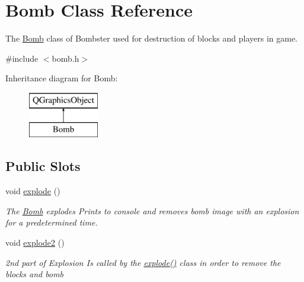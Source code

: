 \hypertarget{class_bomb}{\section{Bomb Class Reference}
\label{class_bomb}
}


The \hyperlink{class_bomb}{Bomb} class of Bombster used for destruction of blocks and players in game.  




{\ttfamily \#include $<$bomb.\-h$>$}

Inheritance diagram for Bomb\-:\begin{figure}[H]
\begin{center}
\leavevmode
\includegraphics[height=2.000000cm]{class_bomb}
\end{center}
\end{figure}
\subsection*{Public Slots}
\begin{DoxyCompactItemize}
\item 
void \hyperlink{class_bomb_a5752ce7daece5c3bf2e2178bcfcb820d}{explode} ()
\begin{DoxyCompactList}\small\item\em The \hyperlink{class_bomb}{Bomb} explodes Prints to console and removes bomb image with an explosion for a predetermined time. \end{DoxyCompactList}\item 
void \hyperlink{class_bomb_ae9410dc9b499dad8e4f0f200d9b0ead7}{explode2} ()
\begin{DoxyCompactList}\small\item\em 2nd part of Explosion Is called by the \hyperlink{class_bomb_a5752ce7daece5c3bf2e2178bcfcb820d}{explode()} class in order to remove the blocks and bomb \end{DoxyCompactList}\end{DoxyCompactItemize}
